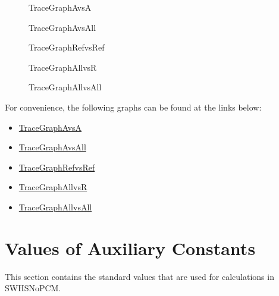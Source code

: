\documentclass[12pt]{article}
\begin{document}
\begin{figure}[H]
\begin{center}

\caption{TraceGraphAvsA}
\label{Figure:TraceGraphAvsA}
\end{center}
\end{figure}
\begin{figure}[H]
\begin{center}

\caption{TraceGraphAvsAll}
\label{Figure:TraceGraphAvsAll}
\end{center}
\end{figure}
\begin{figure}[H]
\begin{center}

\caption{TraceGraphRefvsRef}
\label{Figure:TraceGraphRefvsRef}
\end{center}
\end{figure}
\begin{figure}[H]
\begin{center}

\caption{TraceGraphAllvsR}
\label{Figure:TraceGraphAllvsR}
\end{center}
\end{figure}
\begin{figure}[H]
\begin{center}

\caption{TraceGraphAllvsAll}
\label{Figure:TraceGraphAllvsAll}
\end{center}
\end{figure}
For convenience, the following graphs can be found at the links below:

\begin{itemize}
\item{\hyperref{../../TraceyGraph/avsa.svg}{}{}{TraceGraphAvsA}}
\item{\hyperref{../../TraceyGraph/avsall.svg}{}{}{TraceGraphAvsAll}}
\item{\hyperref{../../TraceyGraph/refvsref.svg}{}{}{TraceGraphRefvsRef}}
\item{\hyperref{../../TraceyGraph/allvsr.svg}{}{}{TraceGraphAllvsR}}
\item{\hyperref{../../TraceyGraph/allvsall.svg}{}{}{TraceGraphAllvsAll}}
\end{itemize}
\section{Values of Auxiliary Constants}
\label{Sec:AuxConstants}
This section contains the standard values that are used for calculations in SWHSNoPCM.
\end{document}
